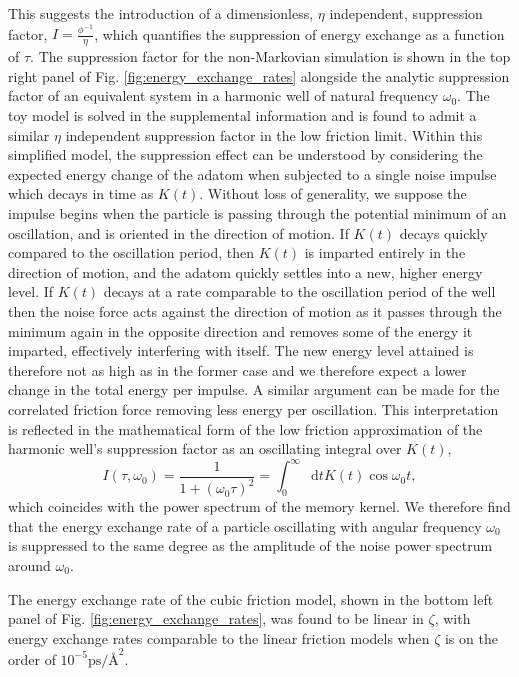 \documentclass[7pt]{article}
\newcommand*{\diff}{\mathop{}\!\mathrm{d}}
\newcommand{\uzeta}{\si{\pico\second\per\angstrom\squared}}
\begin{document}
This suggests the introduction of a dimensionless, $\eta$ independent, suppression factor, $I = \frac{\phi^{-1}}{\eta}$, which quantifies the suppression of energy exchange as a function of $\tau$. The suppression factor for the non-Markovian simulation is shown in the top right panel of Fig. \ref{fig:energy_exchange_rates} alongside the analytic suppression factor of an equivalent system in a harmonic well of natural frequency $\omega_0$. The toy model is solved in the supplemental information and is found to admit a similar $\eta$ independent suppression factor in the low friction limit. Within this simplified model, the suppression effect can be understood by considering the expected energy change of the adatom when subjected to a single noise impulse which decays in time as $K(t)$. Without loss of generality, we suppose the impulse begins when the particle is passing through the potential minimum of an oscillation, and is oriented in the direction of motion. If $K(t)$ decays quickly compared to the oscillation period, then $K(t)$ is imparted entirely in the direction of motion, and the adatom quickly settles into a new, higher energy level. If $K(t)$ decays at a rate comparable to the oscillation period of the well then the noise force acts against the direction of motion as it passes through the minimum again in the opposite direction and removes some of the energy it imparted, effectively interfering with itself. The new energy level attained is therefore not as high as in the former case and we therefore expect a lower change in the total energy per impulse. A similar argument can be made for the correlated friction force removing less energy per oscillation. This interpretation is reflected in the mathematical form of the low friction approximation of the harmonic well's suppression factor as an oscillating integral over $K(t)$,
$$
$$
\begin{equation}
	I(\tau, \omega_0) = \frac{1}{1+\left(\omega_0\tau\right)^2} = \int_0^{\infty}\diff{t}K(t)\cos{\omega_0t},
	\label{eq:suppression_factor}
\end{equation}
which coincides with the power spectrum of the memory kernel. We therefore find that the energy exchange rate of a particle oscillating with angular frequency $\omega_0$ is suppressed to the same degree as the amplitude of the noise power spectrum around $\omega_0$. 

The energy exchange rate of the cubic friction model, shown in the bottom left panel of Fig. \ref{fig:energy_exchange_rates}, was found to be linear in $\zeta$, with energy exchange rates comparable to the linear friction models when $\zeta$ is on the order of $10^{-5}\uzeta$.
\end{document}
